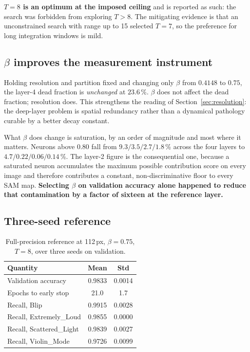 \textbf{$T = 8$ is an optimum at the imposed ceiling} and is reported as such:
the search was forbidden from exploring $T > 8$. The mitigating evidence is that
an unconstrained search with range up to 15 selected $T = 7$, so the preference
for long integration windows is mild.

\subsection{$\beta$ improves the measurement instrument}

Holding resolution and partition fixed and changing only $\beta$ from $0.4148$ to
$0.75$, the layer-4 dead fraction is \emph{unchanged} at $23.6$\,\%. $\beta$ does
not affect the dead fraction; resolution does. This strengthens the reading of
Section~\ref{sec:resolution}: the deep-layer problem is spatial redundancy rather
than a dynamical pathology curable by a better decay constant.

What $\beta$ does change is saturation, by an order of magnitude and most where
it matters. Neurons above $0.80$ fall from $9.3 / 3.5 / 2.7 / 1.8$\,\% across the
four layers to $4.7 / 0.22 / 0.06 / 0.14$\,\%. The layer-2 figure is the
consequential one, because a saturated neuron accumulates the maximum possible
contribution score on every image and therefore contributes a constant,
non-discriminative floor to every SAM map. \textbf{Selecting $\beta$ on
validation accuracy alone happened to reduce that contamination by a factor of
sixteen at the reference layer.}

\subsection{Three-seed reference}

\begin{table}[htbp]
\centering
\begin{tabular}{lcc}
\toprule
Quantity & Mean & Std \\
\midrule
Validation accuracy & 0.9833 & 0.0014 \\
Epochs to early stop & 21.0 & 1.7 \\
Recall, Blip & 0.9915 & 0.0028 \\
Recall, Extremely\_Loud & 0.9855 & 0.0000 \\
Recall, Scattered\_Light & 0.9839 & 0.0027 \\
Recall, Violin\_Mode & 0.9726 & 0.0099 \\
\bottomrule
\end{tabular}
\caption{Full-precision reference at 112\,px, $\beta = 0.75$, $T = 8$, over three
seeds on validation.}
\label{tab:fp32}
\end{table}

